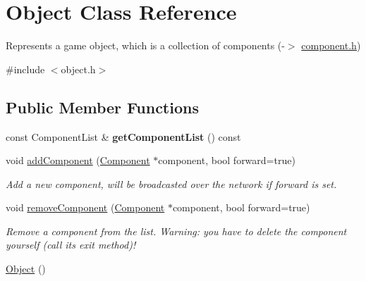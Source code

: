 \hypertarget{classObject}{
\section{\-Object \-Class \-Reference}
\label{d8/d4b/classObject}
}


\-Represents a game object, which is a collection of components (-\/$>$ \hyperlink{component_8h_source}{component.\-h})  




{\ttfamily \#include $<$object.\-h$>$}

\subsection*{\-Public \-Member \-Functions}
\begin{DoxyCompactItemize}
\item 
\hypertarget{classObject_aa6a6da506bdaa17fd66f17c85792a96d}{
const \-Component\-List \& {\bfseries get\-Component\-List} () const }
\label{d8/d4b/classObject_aa6a6da506bdaa17fd66f17c85792a96d}

\item 
\hypertarget{classObject_a991613e7bfb1da6a999c840faf72a482}{
void \hyperlink{classObject_a991613e7bfb1da6a999c840faf72a482}{add\-Component} (\hyperlink{classComponent}{\-Component} $\ast$component, bool forward=true)}
\label{d8/d4b/classObject_a991613e7bfb1da6a999c840faf72a482}

\begin{DoxyCompactList}\small\item\em \-Add a new component, will be broadcasted over the network if forward is set. \end{DoxyCompactList}\item 
\hypertarget{classObject_aadf73fe4d5c43d135389d1b4f13823bd}{
void \hyperlink{classObject_aadf73fe4d5c43d135389d1b4f13823bd}{remove\-Component} (\hyperlink{classComponent}{\-Component} $\ast$component, bool forward=true)}
\label{d8/d4b/classObject_aadf73fe4d5c43d135389d1b4f13823bd}

\begin{DoxyCompactList}\small\item\em \-Remove a component from the list. \-Warning\-: you have to delete the component yourself (call its exit method)! \end{DoxyCompactList}\item 
\hypertarget{classObject_a40860402e64d8008fb42329df7097cdb}{
\hyperlink{classObject_a40860402e64d8008fb42329df7097cdb}{\-Object} ()}
\label{d8/d4b/classObject_a40860402e64d8008fb42329df7097cdb}


\end{DoxyCompactItemize}
